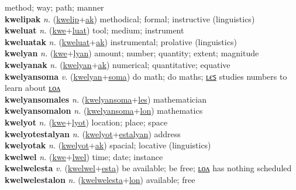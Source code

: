 method; way; path; manner \label{kwelip} \\
\textbf{kwelipak} \textit{n.} (\hyperref[kwelip]{kwelip}+\hyperref[ak]{ak})
methodical; formal; instructive (linguistics) \label{kwelipak} \\
\textbf{kweluat} \textit{n.} (\hyperref[kwe]{kwe}+\hyperref[luat]{luat})
tool; medium; instrument \label{kweluat} \\
\textbf{kweluatak} \textit{n.} (\hyperref[kweluat]{kweluat}+\hyperref[ak]{ak})
instrumental; prolative (linguistics) \label{kweluatak} \\
\textbf{kwelyan} \textit{n.} (\hyperref[kwe]{kwe}+\hyperref[lyan]{lyan})
amount; number; quantity; extent; magnitude \label{kwelyan} \\
\textbf{kwelyanak} \textit{n.} (\hyperref[kwelyan]{kwelyan}+\hyperref[ak]{ak})
numerical; quantitative; equative \label{kwelyanak} \\
\textbf{kwelyansoma} \textit{v.} (\hyperref[kwelyan]{kwelyan}+\hyperref[soma]{soma})
do math; do maths; \hyperref[kwelyansomales]{ʟєꜱ} studies numbers to learn about \hyperref[kwelyansomalon]{ʟᴏᴧ} \label{kwelyansoma} \\
\textbf{kwelyansomales} \textit{n.} (\hyperref[kwelyansoma]{kwelyansoma}+\hyperref[les]{les})
mathematician \label{kwelyansomales} \\
\textbf{kwelyansomalon} \textit{n.} (\hyperref[kwelyansoma]{kwelyansoma}+\hyperref[lon]{lon})
mathematics \label{kwelyansomalon} \\
\textbf{kwelyot} \textit{n.} (\hyperref[kwe]{kwe}+\hyperref[lyot]{lyot})
location; place; space \label{kwelyot} \\
\textbf{kwelyotestalyan} \textit{n.} (\hyperref[kwelyot]{kwelyot}+\hyperref[estalyan]{estalyan})
address \label{kwelyotestalyan} \\
\textbf{kwelyotak} \textit{n.} (\hyperref[kwelyot]{kwelyot}+\hyperref[ak]{ak})
spacial; locative (linguistics) \label{kwelyotak} \\
\textbf{kwelwel} \textit{n.} (\hyperref[kwe]{kwe}+\hyperref[lwel]{lwel})
time; date; instance \label{kwelwel} \\
\textbf{kwelwelesta} \textit{v.} (\hyperref[kwelwel]{kwelwel}+\hyperref[esta]{esta})
be available; be free; \hyperref[kwelwelestalon]{ʟᴏᴧ} has nothing scheduled \label{kwelwelesta} \\
\textbf{kwelwelestalon} \textit{n.} (\hyperref[kwelwelesta]{kwelwelesta}+\hyperref[lon]{lon})
available; free \label{kwelwelestalon} \\
